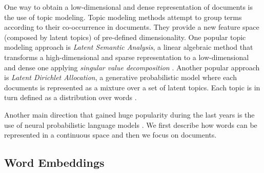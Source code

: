


One way to obtain a low-dimensional and dense representation of documents is the use of topic modeling. Topic modeling methods attempt to group terms according to their co-occurrence in documents. They provide a new feature space (composed by latent topics) of pre-defined dimensionality. One popular topic modeling approach is \textit{Latent Semantic Analysis}, a linear algebraic method that transforms a high-dimensional and sparse representation to a low-dimensional and dense one applying \textit{singular value decomposition} \parencite{kontostathis2006framework}. Another popular approach is \textit{Latent Dirichlet Allocation}, a generative probabilistic model where each documents is represented as a mixture over a set of latent topics. Each topic is in turn defined as a distribution over words \parencite{blei2003latent}.

Another main direction that gained huge popularity during the last years is the use of neural probabilistic language models \parencite{bengio2003neural}. We first describe how words can be represented in a continuous space and then we focus on documents.

\subsection{Word Embeddings}

